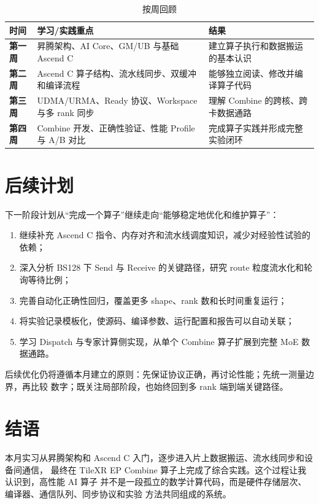 \documentclass[UTF8,a4paper,11pt]{ctexart}
\begin{document}
\begin{table}[htbp]
  \centering
  \caption{按周回顾}
  \begin{tabularx}{\textwidth}{>{\bfseries}p{}X X}
    \toprule
    时间 & 学习/实践重点 & 结果 \\
    \midrule
    第一周 & 昇腾架构、AI Core、GM/UB 与基础 Ascend C & 建立算子执行和数据搬运的基本认识 \\
    第二周 & Ascend C 算子结构、流水线同步、双缓冲和编译流程 & 能够独立阅读、修改并编译算子代码 \\
    第三周 & UDMA/URMA、Ready 协议、Workspace 与多 rank 同步 & 理解 Combine 的跨核、跨卡数据通路 \\
    第四周 & Combine 开发、正确性验证、性能 Profile 与 A/B 对比 & 完成算子实践并形成完整实验闭环 \\
    \bottomrule
  \end{tabularx}
\end{table}

\section{后续计划}

下一阶段计划从“完成一个算子”继续走向“能够稳定地优化和维护算子”：

\begin{enumerate}
  \item 继续补充 Ascend C 指令、内存对齐和流水线调度知识，减少对经验性试验的依赖；
  \item 深入分析 BS128 下 Send 与 Receive 的关键路径，研究 route 粒度流水化和轮询等待比例；
  \item 完善自动化正确性回归，覆盖更多 shape、rank 数和长时间重复运行；
  \item 将实验记录模板化，使源码、编译参数、运行配置和报告可以自动关联；
  \item 学习 Dispatch 与专家计算侧实现，从单个 Combine 算子扩展到完整 MoE 数据通路。
\end{enumerate}

后续优化仍将遵循本月建立的原则：先保证协议正确，再讨论性能；先统一测量边界，再比较
数字；既关注局部阶段，也始终回到多 rank 端到端关键路径。

\section{结语}

本月实习从昇腾架构和 Ascend C 入门，逐步进入片上数据搬运、流水线同步和设备间通信，
最终在 TileXR EP Combine 算子上完成了综合实践。这个过程让我认识到，高性能 AI 算子
并不是一段孤立的数学计算代码，而是硬件存储层次、编译器、通信队列、同步协议和实验
方法共同组成的系统。
\end{document}
